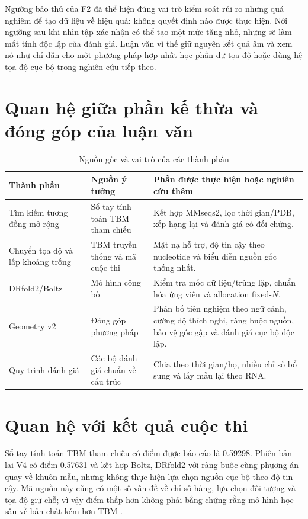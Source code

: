 \documentclass[12pt,a4paper,oneside]{report}
\begin{document}
Ngưỡng bảo thủ của F2 đã thể hiện đúng vai trò kiểm soát rủi ro nhưng quá nghiêm để tạo
dữ liệu về hiệu quả: không quyết định nào được thực hiện. Nới ngưỡng sau khi nhìn tập
xác nhận có thể tạo một mức tăng nhỏ, nhưng sẽ làm mất tính độc lập của đánh giá. Luận
văn vì thế giữ nguyên kết quả âm và xem nó như chỉ dẫn cho một phương pháp hợp nhất học
phần dư tọa độ hoặc dùng hệ tọa độ cục bộ trong nghiên cứu tiếp theo.

\fi
\section{Quan hệ giữa phần kế thừa và đóng góp của luận văn}

\begin{table}[H]
\centering
\caption{Nguồn gốc và vai trò của các thành phần}
\begin{tabularx}{\textwidth}{p{}p{}X}
\toprule
Thành phần & Nguồn ý tưởng & Phần được thực hiện hoặc nghiên cứu thêm\\
\midrule
Tìm kiếm tương đồng mở rộng & Sổ tay tính toán TBM tham chiếu & Kết hợp MMseqs2, lọc thời gian/PDB, xếp hạng lại và đánh giá có đối chứng.\\
Chuyển tọa độ và lấp khoảng trống & TBM truyền thống và mã cuộc thi & Mặt nạ hỗ trợ, độ tin cậy theo nucleotide và biểu diễn nguồn gốc thống nhất.\\
DRfold2/Boltz & Mô hình công bố & Kiểm tra mốc dữ liệu/trùng lặp, chuẩn hóa ứng viên và allocation fixed-$N$.\\
Geometry v2 & Đóng góp phương pháp & Phân bố tiên nghiệm theo ngữ cảnh, cường độ thích nghi, ràng buộc nguồn, bảo vệ góc gập và đánh giá cục bộ độc lập.\\
Quy trình đánh giá & Các bộ đánh giá chuẩn về cấu trúc & Chia theo thời gian/họ, nhiều chỉ số bổ sung và lấy mẫu lại theo RNA.\\
\bottomrule
\end{tabularx}
\end{table}

\section{Quan hệ với kết quả cuộc thi}

Sổ tay tính toán TBM tham chiếu có điểm được báo cáo là 0.59298. Phiên bản lai V4 có điểm
0.57631 và kết hợp Boltz, DRfold2 với ràng buộc cùng phương án quay về khuôn mẫu, nhưng
không thực hiện lựa chọn nguồn cục bộ theo độ tin cậy. Mã nguồn này cũng có một số vấn đề
về chỉ số hàng, lựa chọn đối tượng và tọa độ giữ chỗ; vì vậy điểm thấp hơn không phải
bằng chứng rằng mô hình học sâu về bản chất kém hơn TBM
\cite{top1_tbm,top1_hybrid}.
\end{document}

